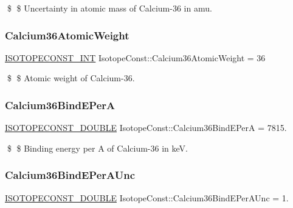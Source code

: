 \$ \$ Uncertainty in atomic mass of Calcium-\/36 in amu. \mbox{\label{group___isotope_const-_calcium-_ca36_gae70529ce188105c47cb35f8f244a74b5}} 
\subsubsection{\texorpdfstring{Calcium36\+Atomic\+Weight}{Calcium36AtomicWeight}}
{\footnotesize\ttfamily \mbox{\hyperlink{group___isotope_const-_macros_ga5f18360b3e99483a35c32d789e62621c}{I\+S\+O\+T\+O\+P\+E\+C\+O\+N\+S\+T\+\_\+\+I\+NT}} Isotope\+Const\+::\+Calcium36\+Atomic\+Weight = 36}

\$ \$ Atomic weight of Calcium-\/36. \mbox{\label{group___isotope_const-_calcium-_ca36_gade22f16757b42129a3df62d1aca727d4}} 
\subsubsection{\texorpdfstring{Calcium36\+Bind\+E\+PerA}{Calcium36BindEPerA}}
{\footnotesize\ttfamily \mbox{\hyperlink{group___isotope_const-_macros_ga8f45a7272ce02c0b4c65c44636ed719a}{I\+S\+O\+T\+O\+P\+E\+C\+O\+N\+S\+T\+\_\+\+D\+O\+U\+B\+LE}} Isotope\+Const\+::\+Calcium36\+Bind\+E\+PerA = 7815.}

\$ \$ Binding energy per A of Calcium-\/36 in keV. \mbox{\label{group___isotope_const-_calcium-_ca36_ga393780d134731e48e60761aec0e41ddc}} 
\subsubsection{\texorpdfstring{Calcium36\+Bind\+E\+Per\+A\+Unc}{Calcium36BindEPerAUnc}}
{\footnotesize\ttfamily \mbox{\hyperlink{group___isotope_const-_macros_ga8f45a7272ce02c0b4c65c44636ed719a}{I\+S\+O\+T\+O\+P\+E\+C\+O\+N\+S\+T\+\_\+\+D\+O\+U\+B\+LE}} Isotope\+Const\+::\+Calcium36\+Bind\+E\+Per\+A\+Unc = 1.}


